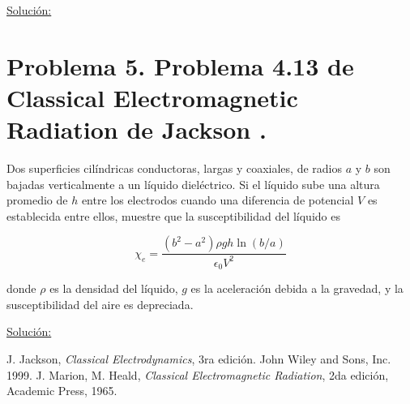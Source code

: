 \documentclass[a4paper,11pt]{article}
\numberwithin{equation}{section}
\begin{document}
\vspace{.3cm}

\underline{Solución:} \vspace{.3cm}

\newpage

\section{Problema 5. Problema 4.13 de Classical Electromagnetic Radiation
de Jackson \cite{jackson}.}

Dos superficies cilíndricas conductoras, largas y coaxiales, de radios $a$ y $b$ 
son bajadas verticalmente a un líquido dieléctrico. Si el líquido sube una altura 
promedio de $h$ entre los electrodos cuando una diferencia de potencial $V$ es 
establecida entre ellos, muestre que la susceptibilidad del líquido es 

$$
\chi_e = \frac{(b^2 - a^2)\rho g h \ln{(b/a)}}{\epsilon_0 V^2}
$$

donde $\rho$ es la densidad del líquido, $g$ es la aceleración debida a la gravedad, 
y la susceptibilidad del aire es depreciada.

\vspace{.3cm}

\underline{Solución:} \vspace{.3cm}

\newpage

\begin{thebibliography}{10}
J. Jackson, \emph{Classical Electrodynamics}, 3ra edición. John Wiley and Sons, Inc. 
1999.
J. Marion, M. Heald, \emph{Classical Electromagnetic Radiation}, 2da edición, Academic 
Press, 1965.
\end{thebibliography}
\end{document}
